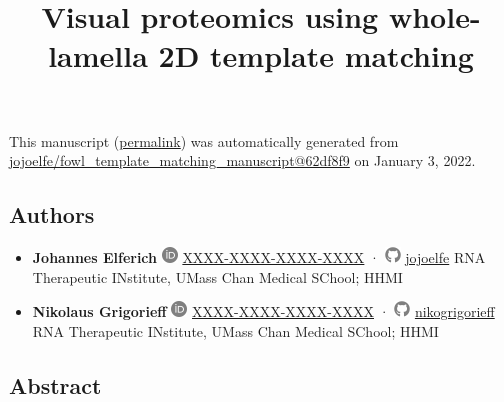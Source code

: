 \documentclass[
]{article}
\title{Visual proteomics using whole-lamella 2D template matching}
\author{}
\date{}
\begin{document}
\maketitle

This manuscript
(\href{https://jojoelfe.github.io/fowl_template_matching_manuscript/v/62df8f94079cea91a7ff27395620b6520811c5b5/}{permalink})
was automatically generated
from \href{https://github.com/jojoelfe/fowl_template_matching_manuscript/tree/62df8f94079cea91a7ff27395620b6520811c5b5}{jojoelfe/fowl\_template\_matching\_manuscript@62df8f9}
on January 3, 2022.

\hypertarget{authors}{%
\subsection{Authors}\label{authors}}

\begin{itemize}
\item
  \textbf{Johannes Elferich}
  \includegraphics[width=0.16667in,height=0.16667in]{images/orcid.svg}
  \href{https://orcid.org/XXXX-XXXX-XXXX-XXXX}{XXXX-XXXX-XXXX-XXXX}
  · \includegraphics[width=0.16667in,height=0.16667in]{images/github.svg}
  \href{https://github.com/jojoelfe}{jojoelfe}
  RNA Therapeutic INstitute, UMass Chan Medical SChool; HHMI
\item
  \textbf{Nikolaus Grigorieff}
  \includegraphics[width=0.16667in,height=0.16667in]{images/orcid.svg}
  \href{https://orcid.org/XXXX-XXXX-XXXX-XXXX}{XXXX-XXXX-XXXX-XXXX}
  · \includegraphics[width=0.16667in,height=0.16667in]{images/github.svg}
  \href{https://github.com/nikogrigorieff}{nikogrigorieff}
  RNA Therapeutic INstitute, UMass Chan Medical SChool; HHMI
\end{itemize}

\hypertarget{abstract}{%
\subsection{Abstract}\label{abstract}}
\end{document}
